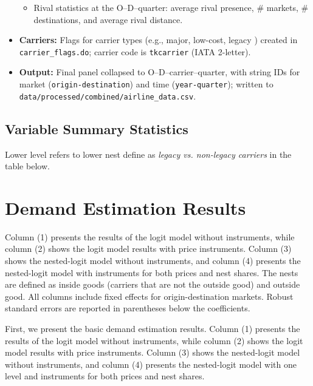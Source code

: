 \documentclass{article}
\begin{document}
\begin{itemize}
\begin{itemize}
    \item Rival statistics at the O--D--quarter: average rival presence, \# markets, \# destinations, and average rival distance.
  \end{itemize}
  \item \textbf{Carriers:} Flags for carrier types (e.g., major, low-cost, legacy ) created in \texttt{carrier\_flags.do}; carrier code is \texttt{tkcarrier} (IATA 2-letter).
  \item \textbf{Output:} Final panel collapsed to O--D--carrier--quarter, with string IDs for market (\texttt{origin-destination}) and time (\texttt{year-quarter}); written to \texttt{data/processed/combined/airline\_data.csv}.
\end{itemize}

\subsection*{Variable Summary Statistics}
Lower level refers to lower nest define as \textit{legacy vs. non-legacy carriers} in the table below.

% 


\pagebreak
\section{Demand Estimation Results}

Column (1) presents the results of the logit model without instruments,
while column (2) shows the logit model results with price instruments. 
Column (3) shows the nested-logit model without instruments, and 
column (4) presents the nested-logit model with instruments for both prices and nest shares.  The nests are defined as inside goods (carriers that are not the outside good) and outside good.
All columns include fixed effects for origin-destination markets. Robust standard errors are reported in parentheses below the coefficients.



First, we present the basic demand estimation results. Column (1) presents the results of the logit model without instruments, while column (2) shows the logit model results with price instruments. Column (3) shows the nested-logit model without instruments, and column (4) presents the nested-logit model with one level  and instruments for both prices and nest shares.
\end{document}
